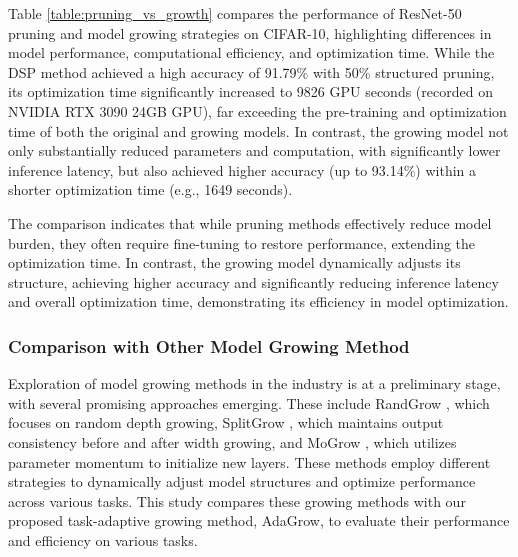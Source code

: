\documentclass[preprint,12pt]{elsarticle}
\begin{document}
Table \ref{table:pruning_vs_growth} compares the performance of ResNet-50 pruning and model growing strategies on CIFAR-10, highlighting differences in model performance, computational efficiency, and optimization time. While the DSP method achieved a high accuracy of 91.79\% with 50\% structured pruning, its optimization time significantly increased to 9826 GPU seconds (recorded on NVIDIA RTX 3090 24GB GPU), far exceeding the pre-training and optimization time of both the original and growing models. In contrast, the growing model not only substantially reduced parameters and computation, with significantly lower inference latency, but also achieved higher accuracy (up to 93.14\%) within a shorter optimization time (e.g., 1649 seconds).

The comparison indicates that while pruning methods effectively reduce model burden, they often require fine-tuning to restore performance, extending the optimization time. In contrast, the growing model dynamically adjusts its structure, achieving higher accuracy and significantly reducing inference latency and overall optimization time, demonstrating its efficiency in model optimization.

\subsubsection{Comparison with Other Model Growing Method}

Exploration of model growing methods in the industry is at a preliminary stage, with several promising approaches emerging. These include RandGrow \cite{autogrow}, which focuses on random depth growing, SplitGrow \cite{splitgrow}, which maintains output consistency before and after width growing, and MoGrow \cite{mogrow}, which utilizes parameter momentum to initialize new layers. These methods employ different strategies to dynamically adjust model structures and optimize performance across various tasks. This study compares these growing methods with our proposed task-adaptive growing method, AdaGrow, to evaluate their performance and efficiency on various tasks.
\end{document}
